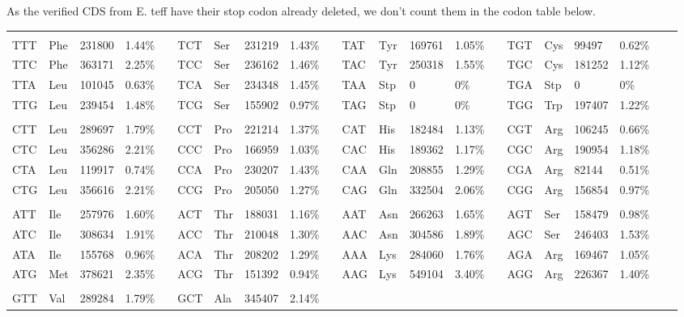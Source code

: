 As the verified CDS from E. teff have their stop codon already deleted, we don't count them in the codon table below.\\
\begin{table}
\begin{center}
{\tiny
\begin{tabular}{*{21}{l}}
\hline
\\
TTT & Phe & 231800	& 1.44\%	&	&
TCT & Ser & 231219	& 1.43\%	&	&
TAT & Tyr & 169761	& 1.05\%	&	&
TGT & Cys & 99497	& 0.62\%	&	&
\\
TTC & Phe & 363171	& 2.25\%	&	&
TCC & Ser & 236162	& 1.46\%	&	&
TAC & Tyr & 250318	& 1.55\%	&	&
TGC & Cys & 181252	& 1.12\%	&	&
\\
TTA & Leu & 101045	& 0.63\%	&	&
TCA & Ser & 234348	& 1.45\%	&	&
TAA & Stp & 0	& 0\%	&	&
TGA & Stp & 0	& 0\%	&	&
\\
TTG & Leu & 239454	& 1.48\%	&	&
TCG & Ser & 155902	& 0.97\%	&	&
TAG & Stp & 0	& 0\%	&	&
TGG & Trp & 197407	& 1.22\%	&	&
\\
\\
CTT & Leu & 289697	& 1.79\%	&	&
CCT & Pro & 221214	& 1.37\%	&	&
CAT & His & 182484	& 1.13\%	&	&
CGT & Arg & 106245	& 0.66\%	&	&
\\
CTC & Leu & 356286	& 2.21\%	&	&
CCC & Pro & 166959	& 1.03\%	&	&
CAC & His & 189362	& 1.17\%	&	&
CGC & Arg & 190954	& 1.18\%	&	&
\\
CTA & Leu & 119917	& 0.74\%	&	&
CCA & Pro & 230207	& 1.43\%	&	&
CAA & Gln & 208855	& 1.29\%	&	&
CGA & Arg & 82144	& 0.51\%	&	&
\\
CTG & Leu & 356616	& 2.21\%	&	&
CCG & Pro & 205050	& 1.27\%	&	&
CAG & Gln & 332504	& 2.06\%	&	&
CGG & Arg & 156854	& 0.97\%	&	&
\\
\\
ATT & Ile & 257976	& 1.60\%	&	&
ACT & Thr & 188031	& 1.16\%	&	&
AAT & Asn & 266263	& 1.65\%	&	&
AGT & Ser & 158479	& 0.98\%	&	&
\\
ATC & Ile & 308634	& 1.91\%	&	&
ACC & Thr & 210048	& 1.30\%	&	&
AAC & Asn & 304586	& 1.89\%	&	&
AGC & Ser & 246403	& 1.53\%	&	&
\\
ATA & Ile & 155768	& 0.96\%	&	&
ACA & Thr & 208202	& 1.29\%	&	&
AAA & Lys & 284060	& 1.76\%	&	&
AGA & Arg & 169467	& 1.05\%	&	&
\\
ATG & Met & 378621	& 2.35\%	&	&
ACG & Thr & 151392	& 0.94\%	&	&
AAG & Lys & 549104	& 3.40\%	&	&
AGG & Arg & 226367	& 1.40\%	&	&
\\
\\
GTT & Val & 289284	& 1.79\%	&	&
GCT & Ala & 345407	& 2.14\%	&	&

\end{tabular}}
\end{center}
\end{table}
